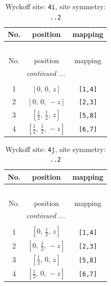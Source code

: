 \documentclass[fleqn,8pt]{jsarticle}
\begin{document}
\renewcommand{\arraystretch}{1.2}
\begin{longtable}{ccc}
\caption{Wyckoff site: {\tt 4i}, site symmetry: {\tt ..2}}
 \\
 \hline \hline
No. & position & mapping \\ \hline \endfirsthead

\multicolumn{2}{l}{\tablename\ \thetable{}} \\
 \hline \hline
No. & position & mapping \\ \hline \endhead

 \hline \hline
\multicolumn{2}{r}{\footnotesize\it continued ...} \\ \endfoot

 \hline \hline
\multicolumn{2}{r}{} \\ \endlastfoot

1 & $\left[ 0,\, 0,\, z \right]$ & {\tt [1,4]} \\ \hline
2 & $\left[ 0,\, 0,\, - z \right]$ & {\tt [2,3]} \\ \hline
3 & $\left[ \frac{1}{2},\, \frac{1}{2},\, z \right]$ & {\tt [5,8]} \\ \hline
4 & $\left[ \frac{1}{2},\, \frac{1}{2},\, - z \right]$ & {\tt [6,7]} \\
\end{longtable}
\renewcommand{\arraystretch}{1.2}
\begin{longtable}{ccc}
\caption{Wyckoff site: {\tt 4j}, site symmetry: {\tt ..2}}
 \\
 \hline \hline
No. & position & mapping \\ \hline \endfirsthead

\multicolumn{2}{l}{\tablename\ \thetable{}} \\
 \hline \hline
No. & position & mapping \\ \hline \endhead

 \hline \hline
\multicolumn{2}{r}{\footnotesize\it continued ...} \\ \endfoot

 \hline \hline
\multicolumn{2}{r}{} \\ \endlastfoot

1 & $\left[ 0,\, \frac{1}{2},\, z \right]$ & {\tt [1,4]} \\ \hline
2 & $\left[ 0,\, \frac{1}{2},\, - z \right]$ & {\tt [2,3]} \\ \hline
3 & $\left[ \frac{1}{2},\, 0,\, z \right]$ & {\tt [5,8]} \\ \hline
4 & $\left[ \frac{1}{2},\, 0,\, - z \right]$ & {\tt [6,7]} \\
\end{longtable}
\end{document}
